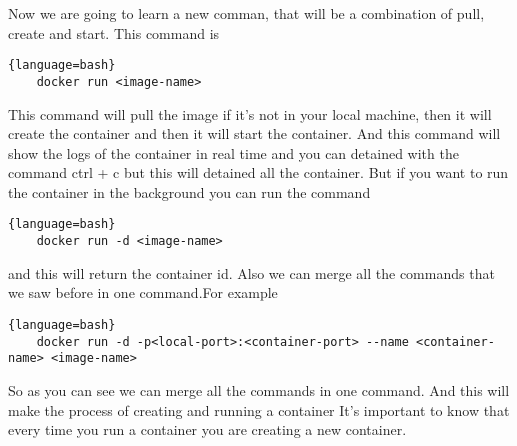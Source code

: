 \documentclass{article}
\begin{document}
Now we are going to learn a new comman, that will be a combination of pull, create and start. This command is 
\begin{lstlisting}{language=bash}
    docker run <image-name>
\end{lstlisting}

This command will pull the image if it's not in your local machine, then it will create the container and 
then it will start the container. And this command will show the logs of the container in real time and you can 
detained with the command ctrl + c but this will detained all the container. But if you want to run the container 
in the background you can run the command
\begin{lstlisting}{language=bash}
    docker run -d <image-name>
\end{lstlisting}

and this will return the container id.  Also we can merge all the commands that we saw before in one command.For example
\begin{lstlisting}{language=bash}
    docker run -d -p<local-port>:<container-port> --name <container-name> <image-name>
\end{lstlisting}

So as you can see we can merge all the commands in one command. And this will make the process of creating and running a container
It's important to know that every time you run a container you are creating a new container. 
\end{document}
